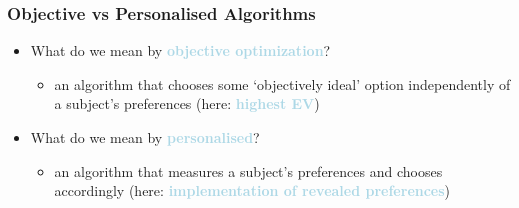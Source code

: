 \documentclass[xcolor=dvipsnames, 10pt]{beamer}
\begin{document}
	
	
	\begin{frame}
		\frametitle{Objective vs Personalised Algorithms}%
	\begin{itemize}
		\setlength\itemsep{1em}
		\item What do we mean by \textcolor{lightblue}{\textbf{objective optimization}}?%
		\begin{itemize}
			\item an algorithm that chooses some ‘objectively ideal’ option independently of a subject’s preferences (here: \textcolor{lightblue}{\textbf{highest EV}})\vspace{-.2cm}
		\end{itemize}
		\item What do we mean by \textcolor{lightblue}{\textbf{personalised}}?%
		\begin{itemize}
			\item an algorithm that measures a subject’s preferences and chooses accordingly (here: \textcolor{lightblue}{\textbf{implementation of revealed preferences}})\vspace{-.2cm}
		\end{itemize}
	\end{itemize}
\end{frame}
\end{document}
